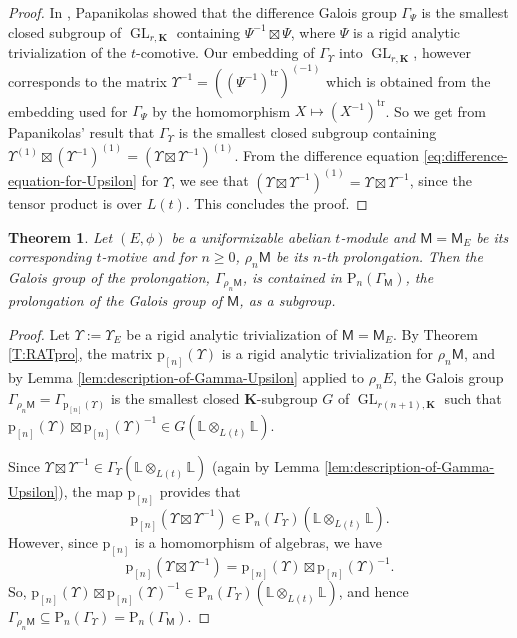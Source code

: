 \documentclass[10pt,a4paper]{amsart}
\theoremstyle{plain} %
\newtheorem{Theorem}{Theorem}[section]
\theoremstyle{definition}
\theoremstyle{remark}
\newcommand{\bK}{\mathbf{K}}
\newcommand{\rP}[1]{\mathrm{P}_{\!#1}}
\newcommand{\tr}{\operatorname{tr}}
\newcommand{\GL}{\operatorname{GL}}
\newcommand{\mot}{\mathsf{M}}  %
\newcommand{\prol}[1]{\mathrm{p}_{[#1]}}
\newcommand{\fracTate}{\mathbb{L}}  %
\numberwithin{equation}{subsection}
\begin{document}
\begin{proof}
In \cite[\S 4.2.1]{mp:tdadmaicl}, Papanikolas showed that the difference Galois group $\Gamma_\Psi$ is the smallest closed subgroup of $\GL_{r,\bK}$ containing  $\Psi^{-1}\boxtimes \Psi$, where $\Psi$ is a rigid analytic trivialization of the $t$-comotive.
Our embedding of $\Gamma_\Upsilon$ into $\GL_{r,\bK}$, however corresponds to the matrix 
$\Upsilon^{-1}=((\Psi^{-1})^{\tr})^{(-1)}$ which is obtained from the embedding used for $\Gamma_\Psi$ by the homomorphism $X\mapsto (X^{-1})^{\tr}$.
So we get from Papanikolas' result that $\Gamma_\Upsilon$ is the smallest closed subgroup containing $\Upsilon^{(1)}\boxtimes (\Upsilon^{-1})^{(1)}=\left(\Upsilon\boxtimes \Upsilon^{-1}\right)^{(1)}$.
From the difference equation \eqref{eq:difference-equation-for-Upsilon} for $\Upsilon$, we see that $\left(\Upsilon\boxtimes \Upsilon^{-1}\right)^{(1)}=\Upsilon\boxtimes \Upsilon^{-1}$, since the tensor product is over $L(t)$.
This concludes the proof.
\end{proof}


\begin{Theorem}\label{thm:upper-bound-on-group-of-prolongation}
    Let $(E,\phi)$ be a uniformizable abelian $t$-module and $\mot=\mot_E$ be its corresponding $t$-motive and for $n \geq 0$, $\rho_n \mot$ be its $n$-th prolongation.
    Then the Galois group of the prolongation, $\Gamma_{\rho_n \mot}$, is contained in $\rP{n}(\Gamma_\mot)$, the prolongation of the Galois group of $\mot$,  as a subgroup.
\end{Theorem}

 \begin{proof}
    Let $\Upsilon:=\Upsilon_E$ be a rigid analytic trivialization of $\mot=\mot_E$.
    By Theorem \ref{T:RATpro}, the matrix $\prol{n}(\Upsilon)$ is a rigid analytic trivialization for $\rho_n \mot$, and by Lemma \ref{lem:description-of-Gamma-Upsilon} applied to $\rho_n E$, the Galois group $\Gamma_{\rho_n \mot}=\Gamma_{\prol{n}(\Upsilon)}$ is the smallest closed $\bK$-subgroup $G$ of $\GL_{r(n+1),\bK}$ such that $\prol{n}(\Upsilon)\boxtimes \prol{n}(\Upsilon)^{-1}\in G(\fracTate\otimes_{L(t)}\fracTate)$.
  
    Since $\Upsilon\boxtimes\Upsilon^{-1}\in \Gamma_\Upsilon(\fracTate\otimes_{L(t)}\fracTate)$ (again by Lemma \ref{lem:description-of-Gamma-Upsilon}), the map $\prol{n}$ provides that
    \[ \prol{n}(\Upsilon\boxtimes\Upsilon^{-1})\in \rP{n}(\Gamma_\Upsilon)(\fracTate\otimes_{L(t)}\fracTate).\]
    However, since $\prol{n}$ is a homomorphism of algebras, we have
    \[ \prol{n}(\Upsilon\boxtimes\Upsilon^{-1})=\prol{n}(\Upsilon)\boxtimes \prol{n}(\Upsilon)^{-1}.\]
    So, $\prol{n}(\Upsilon)\boxtimes \prol{n}(\Upsilon)^{-1}\in \rP{n}(\Gamma_\Upsilon)(\fracTate\otimes_{L(t)}\fracTate)$, and hence $\Gamma_{\rho_n\mot}\subseteq \rP{n}(\Gamma_\Upsilon)=\rP{n}(\Gamma_\mot)$.
 \end{proof}
\end{document}
